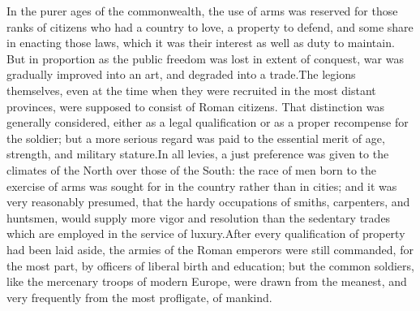 In the purer ages of the commonwealth, the use of arms was
reserved for those ranks of citizens who had a country to love, a
property to defend, and some share in enacting those laws, which
it was their interest as well as duty to maintain. But in
proportion as the public freedom was lost in extent of conquest,
war was gradually improved into an art, and degraded into a
trade.\footnotemark[30] The legions themselves, even at the time when they were
recruited in the most distant provinces, were supposed to consist
of Roman citizens. That distinction was generally considered,
either as a legal qualification or as a proper recompense for the
soldier; but a more serious regard was paid to the essential
merit of age, strength, and military stature.\footnotemark[31] In all levies, a
just preference was given to the climates of the North over those
of the South: the race of men born to the exercise of arms was
sought for in the country rather than in cities; and it was very
reasonably presumed, that the hardy occupations of smiths,
carpenters, and huntsmen, would supply more vigor and resolution
than the sedentary trades which are employed in the service of
luxury.\footnotemark[32] After every qualification of property had been laid
aside, the armies of the Roman emperors were still commanded, for
the most part, by officers of liberal birth and education; but
the common soldiers, like the mercenary troops of modern Europe,
were drawn from the meanest, and very frequently from the most
profligate, of mankind.



